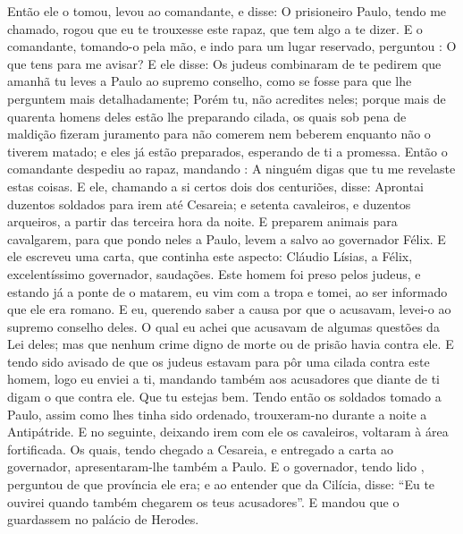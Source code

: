 {Então ele o tomou, levou ao comandante, e disse: O prisioneiro Paulo, tendo me chamado, rogou
{} que eu te trouxesse este rapaz, que tem algo a te dizer.
E o comandante, tomando-o pela mão, e indo para um lugar reservado, perguntou
{} : O que tens para me avisar?
E ele disse: Os judeus combinaram de te pedirem que amanhã tu leves a Paulo ao supremo conselho, como se fosse para que lhe perguntem mais detalhadamente;
Porém tu, não acredites neles; porque mais de quarenta homens deles estão lhe preparando cilada, os quais sob pena de maldição fizeram juramento para não comerem nem beberem enquanto não o tiverem matado; e eles já estão preparados, esperando de ti a promessa.
Então o comandante despediu ao rapaz, mandando
{} : A ninguém digas que tu me revelaste estas coisas.
E ele, chamando a si certos dois dos centuriões, disse: Aprontai duzentos soldados para irem até Cesareia; e setenta cavaleiros, e duzentos arqueiros, a partir das terceira hora da noite.
E preparem animais para cavalgarem, para que pondo neles a Paulo, levem
{} a salvo ao governador Félix.
E ele
{} escreveu uma carta, que continha este aspecto:
Cláudio Lísias, a Félix, excelentíssimo governador, saudações.
Este homem foi preso pelos judeus, e estando já a ponte de o matarem, eu vim com a tropa e
{} tomei, ao ser informado que ele era romano.
E eu, querendo saber a causa por que o acusavam, levei-o ao supremo conselho deles.
O qual eu achei que acusavam de algumas questões da Lei deles; mas que nenhum crime digno de morte ou de prisão havia contra ele.
E tendo sido avisado de que os judeus estavam para pôr uma cilada contra este homem, logo eu
{} enviei a ti, mandando também aos acusadores que diante de ti digam o que
{} contra ele. Que tu estejas bem.
Tendo então os soldados tomado a Paulo, assim como lhes tinha sido ordenado, trouxeram-no durante a noite a Antipátride.
E no
{} seguinte, deixando irem com ele os cavaleiros, voltaram à área fortificada.
Os quais, tendo chegado a Cesareia, e entregado a carta ao governador, apresentaram-lhe também a Paulo.
E o governador, tendo lido
{} , perguntou de que província ele era; e ao entender que
{} da Cilícia,
disse: “Eu te ouvirei quando também chegarem os teus acusadores”. E mandou que o guardassem no palácio
 de Herodes.

}
